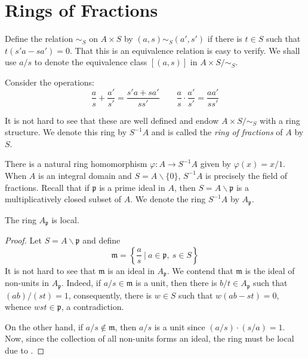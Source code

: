 \section{Rings of Fractions}

Define the relation $\sim_S$ on $A\times S$ by $(a,s)\sim_S(a',s')$ if there is $t\in S$ such that $t(s'a - sa') = 0$. That this is an equivalence relation is easy to verify. We shall use $a/s$ to denote the equivalence class $[(a,s)]$ in $A\times S/\sim_S$.

Consider the operations: 
\begin{equation*}
    \frac{a}{s} + \frac{a'}{s'} = \frac{s'a + sa'}{ss'}\qquad\frac{a}{s}\cdot\frac{a'}{s'} = \frac{aa'}{ss'}
\end{equation*}

It is not hard to see that these are well defined and endow $A\times S/\sim_S$ with a ring structure. We denote this ring by $S^{-1}A$ and is called the \textit{ring of fractions} of $A$ by $S$. 

There is a natural ring homomorphism $\varphi: A\to S^{-1}A$ given by $\varphi(x) = x/1$.
When $A$ is an integral domain and $S = A\backslash\{0\}$, $S^{-1}A$ is precisely the field of fractions.
Recall that if $\mathfrak p$ is a prime ideal in $A$, then $S = A\backslash\mathfrak p$ is a multiplicatively closed subset of $A$. We denote the ring $S^{-1}A$ by $A_{\mathfrak p}$.

\begin{theorem}
    The ring $A_{\mathfrak p}$ is local.
\end{theorem}
\begin{proof}
    Let $S = A\backslash\mathfrak p$ and define
    \begin{equation*}
        \mathfrak m = \left\{\frac{a}{s}~\bigg\vert~a\in\mathfrak p,~s\in S\right\}
    \end{equation*}
    It is not hard to see that $\mathfrak m$ is an ideal in $A_{\mathfrak p}$. We contend that $\mathfrak m$ is the ideal of non-units in $A_{\mathfrak p}$. Indeed, if $a/s\in\mathfrak m$ is a unit, then there is $b/t\in A_{\mathfrak p}$ such that $(ab)/(st) = 1$, consequently, there is $w\in S$ such that $w(ab - st) = 0$, whence $wst\in\mathfrak p$, a contradiction. 

    On the other hand, if $a/s\notin\mathfrak m$, then $a/s$ is a unit since $(a/s)\cdot(s/a) = 1$. Now, since the collection of all non-units forms an ideal, the ring must be local due to .
\end{proof}

